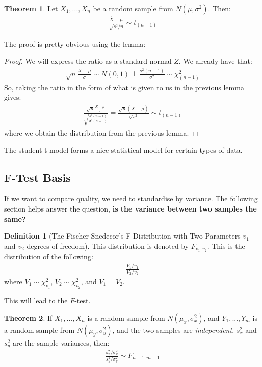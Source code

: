\documentclass[11pt]{scrartcl}
\theoremstyle{definition}
\newtheorem{theorem}{Theorem}
\newtheorem{definition}{Definition}
\theoremstyle{remark}
\begin{document}
{\begin{theorem}
	Let $X_1, ..., X_n$ be a random sample from $N(\mu, \sigma^2)$. Then: 
	\begin{align*}
		\frac{\overline{X} - \mu}{\sqrt{ s^2/n} } \sim t_{(n-1)} 	
	\end{align*}
\end{theorem}
The proof is pretty obvious using the lemma: 
\begin{proof}
	We will express the ratio as a standard normal $Z$. We already have that: 
	\begin{align*}
		\sqrt{n} \frac{\overline{X} - \mu}{\sigma} \sim N(0,1) \perp \frac{s^2 (n-1)}{\sigma^2} \sim \chi^2_{(n-1)} 	
	\end{align*}
	So, taking the ratio in the form of what is given to us in the previous lemma gives: 
	\begin{align*}
		\frac{\sqrt{n} \frac{\overline{X} - \mu}{\sigma}}{\sqrt{\frac{s^2(n-1)}{\sigma^2 (n-1)}}} = \frac{\sqrt{n} (\overline{X} - \mu)}{\sqrt{s^2} } \sim t_{(n-1)} 
	\end{align*}
	where we obtain the distribution from the previous lemma. 
\end{proof}
The student-t model forms a nice statistical model for certain types of data. 

\subsection{F-Test Basis}

If we want to compare quality, we need to standardise by variance. The following section helps answer the question, \textbf{is the variance between two samples the same?}

\begin{definition}[The Fischer-Snedecor's F Distribution with Two Parameters $v_1$ and $v_2$ degrees of freedom] This distribution is denoted by $F_{v_1, v_2} $. This is the distribution of the following: 
\begin{align*}
	\frac{V_1 / v_1}{V_2/v_2}	
\end{align*}
	where $V_1 \sim \chi_{v_1}^2$, $V_2 \sim \chi_{v_2}^2$, and $V_1 \perp V_2$. 
\end{definition}

This will lead to the $F$-test. 

\begin{theorem}
	If $X_1, ..., X_n$ is a random sample from $N(\mu_x, \sigma_x^2)$, and $Y_1, ..., Y_m$ is a random sample from $N(\mu_y, \sigma^2_y)$, and the two samples are \emph{independent}, $s_x^2$ and $s_y^2$ are the sample variances, then: 
	\begin{align*}
		\frac{s^2_x / \sigma^2_x}{s^2_y / \sigma^2_y }	 \sim F_{n-1, m-1} 
	\end{align*}
\end{theorem}

}
\end{document}
